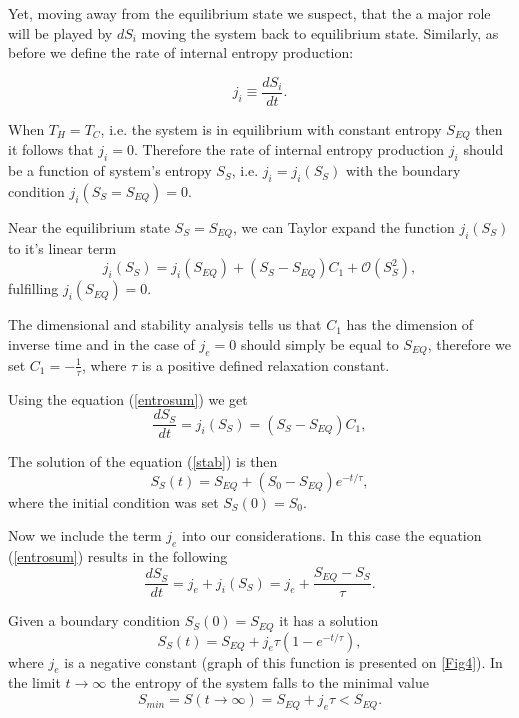 \documentclass[a4paper,12pt]{article}
\begin{document}
Yet, moving away from the equilibrium state we suspect, that the a major role will be played by $dS_i$ moving the system back to equilibrium state. Similarly, as before we define the rate of internal entropy production:

\begin{equation}
j_i \equiv \frac{dS_i}{dt}.   
\end{equation} 

When $T_H=T_C$, i.e. the system is in equilibrium with constant entropy $S_{EQ}$ then it follows that $j_i=0$.
Therefore the rate of internal entropy production $j_i$ should be a function  of system's entropy $S_S$, i.e. $j_i = j_i(S_S)$ with the boundary condition $j_i(S_S=S_{EQ})=0$. 

Near the equilibrium state $S_S=S_{EQ}$, we can Taylor expand the function $j_i(S_S)$ to it's linear term
\begin{equation}
j_i(S_S)=j_i\left(S_{EQ}\right)+\left(S_S-S_{EQ}\right)C_1+\mathcal{O}\left(S_S^2\right),
\end{equation} 
fulfilling $j_i\left(S_{EQ}\right)=0$. 

The dimensional and stability analysis tells us that $C_1$ has the dimension of inverse time and in the case of 
$j_e=0$ should simply be equal to $S_{EQ}$, therefore we set $C_1 = -\frac{1}{\tau}$, where $\tau$ is a positive defined relaxation constant.

Using the equation (\ref{entrosum}) we get
\begin{equation}
\frac{dS_S}{dt}=j_i\left(S_S\right)=\left(S_S-S_{EQ}\right)C_1, 
\label{stab}
\end{equation} 

The solution of the equation (\ref{stab}) is then
\begin{equation}
S_S(t) =S_{EQ}+(S_0-S_{EQ})e^{-t/\tau}, 
\end{equation}
where the initial condition was set $S_S(0)=S_0$.


Now we include the term $j_e$ into our considerations.
In this case the equation (\ref{entrosum}) results in the following 
\begin{equation}
\frac{dS_S}{dt}=j_e + j_i\left(S_S\right)=j_e +\frac{S_{EQ}-S_S}{\tau}.
\label{dSSdt}
\end{equation} 

 
Given a boundary condition $S_S(0) =S_{EQ}$ it has a solution
\begin{equation}
S_S(t)=S_{EQ}+j_e\tau \left(1-e^{-t/\tau }\right),
\end{equation} 
where $j_e$ is a negative constant (graph of this function is presented on \ref{Fig4}). 
In the limit $t\rightarrow \infty$ the entropy of the system falls to the minimal value
\begin{equation}
S_{min}=S(t\rightarrow \infty) =S_{EQ}+j_e \tau < S_{EQ}.
\end{equation}
\end{document}

